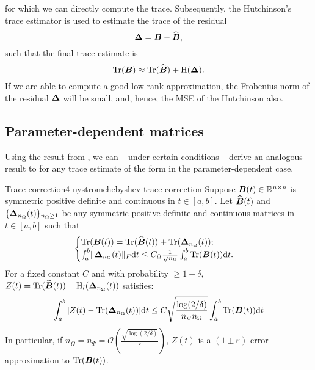 for which we can directly compute the trace. Subsequently, the
Hutchinson's trace estimator 
is used to estimate the trace of the residual
\begin{equation}
    \boldsymbol{\Delta} = \boldsymbol{B} - \widehat{\boldsymbol{B}},
    \label{equ:4-nystromchebyshev-residual}
\end{equation}
such that the final trace estimate is
\begin{equation}
    \operatorname{Tr}(\boldsymbol{B}) \approx \operatorname{Tr}(\widehat{\boldsymbol{B}}) + \operatorname{H}(\boldsymbol{\Delta}).
    \label{equ:4-nystromchebyshev-hutch-pp}
\end{equation}
If we are able to compute a good low-rank approximation, the Frobenius norm
of the residual $\boldsymbol{\Delta}$ will be small, and, hence, the \gls{MSE}
of the Hutchinson  also.

\subsection{Parameter-dependent matrices}
\label{subsec:4-nystromchebyshev-reduction-parametrized-matrices}

Using the result from ,
we can -- under certain conditions -- derive an analogous result
to \cite{meyer2021hutch} for any trace estimate of the form
 in the parameter-dependent case.

\begin{theorem}{Trace correction}{4-nystromchebyshev-trace-correction}
    Suppose $\boldsymbol{B}(t) \in \mathbb{R}^{n \times n}$ is symmetric positive definite
    and continuous in $t \in [a, b]$. Let $\widehat{\boldsymbol{B}}(t)$ and
    $\{\boldsymbol{\Delta}_{n_{\Omega}}(t)\}_{n_{\Omega} \geq 1}$ be any
    symmetric positive definite and continuous matrices in $t \in [a, b]$ such that
    \begin{equation}
        \begin{cases}
            \operatorname{Tr}(\boldsymbol{B}(t)) = \operatorname{Tr}(\widehat{\boldsymbol{B}}(t)) + \operatorname{Tr}(\boldsymbol{\Delta}_{n_{\Omega}}(t)); \\
            \int_{a}^{b} \lVert \boldsymbol{\Delta}_{n_{\Omega}}(t) \rVert _F \mathrm{d}t \leq C_{\Omega} \frac{1}{\sqrt{n_{\Omega}}} \int_{a}^{b} \operatorname{Tr}(\boldsymbol{B}(t)) \mathrm{d}t.
        \end{cases}
    \end{equation}
    For a fixed constant $C$ and with probability $\geq 1 - \delta$, $Z(t) = \operatorname{Tr}(\widehat{\boldsymbol{B}}(t)) + \operatorname{H}_l(\boldsymbol{\Delta}_{n_{\Omega}}(t))$ satisfies:
    \begin{equation}
        \int_{a}^{b} |Z(t) - \operatorname{Tr}(\boldsymbol{\Delta}_{n_{\Omega}}(t))| \mathrm{d}t \leq C \sqrt{\frac{\log(2/\delta)}{n_{\Psi} n_{\Omega}}} \int_{a}^{b} \operatorname{Tr}(\boldsymbol{B}(t)) \mathrm{d}t
    \end{equation}
    In particular, if $n_{\Omega}=n_{\Psi}=\mathcal{O}\left( \frac{\sqrt{\log(2/\delta)}}{\varepsilon} \right)$, $Z(t)$ is a $(1 \pm \varepsilon)$ error approximation to $\operatorname{Tr}(\boldsymbol{B}(t))$.
\end{theorem}

